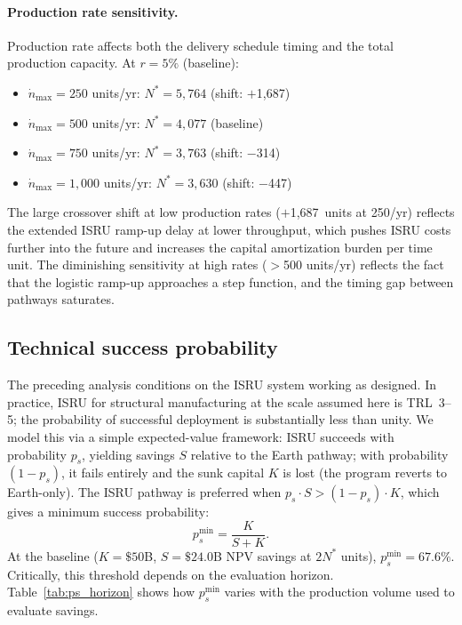 \documentclass[preprint,12pt]{elsarticle}
\begin{document}
\paragraph{Production rate sensitivity.} Production rate affects both the delivery schedule timing and the total production capacity. At $r = 5\%$ (baseline):

\begin{itemize}
\item $\dot{n}_{\max} = 250$ units/yr: $N^* = 5{,}764$ (shift: $+$1{,}687)
\item $\dot{n}_{\max} = 500$ units/yr: $N^* = 4{,}077$ (baseline)
\item $\dot{n}_{\max} = 750$ units/yr: $N^* = 3{,}763$ (shift: $-$314)
\item $\dot{n}_{\max} = 1{,}000$ units/yr: $N^* = 3{,}630$ (shift: $-$447)
\end{itemize}

The large crossover shift at low production rates ($+$1{,}687~units at 250/yr) reflects the extended ISRU ramp-up delay at lower throughput, which pushes ISRU costs further into the future and increases the capital amortization burden per time unit. The diminishing sensitivity at high rates ($>$500 units/yr) reflects the fact that the logistic ramp-up approaches a step function, and the timing gap between pathways saturates.

\subsection{Technical success probability}
\label{sec:success_probability}

The preceding analysis conditions on the ISRU system working as designed. In practice, ISRU for structural manufacturing at the scale assumed here is TRL~3--5; the probability of successful deployment is substantially less than unity. We model this via a simple expected-value framework: ISRU succeeds with probability $p_s$, yielding savings $S$ relative to the Earth pathway; with probability $(1 - p_s)$, it fails entirely and the sunk capital $K$ is lost (the program reverts to Earth-only). The ISRU pathway is preferred when $p_s \cdot S > (1 - p_s) \cdot K$, which gives a minimum success probability:
\begin{equation}
  p_s^{\min} = \frac{K}{S + K}.
  \label{eq:p_success}
\end{equation}
At the baseline ($K = \$50$B, $S = \$24.0$B NPV savings at $2N^*$ units), $p_s^{\min} = 67.6\%$. Critically, this threshold depends on the evaluation horizon. Table~\ref{tab:ps_horizon} shows how $p_s^{\min}$ varies with the production volume used to evaluate savings.
\end{document}
